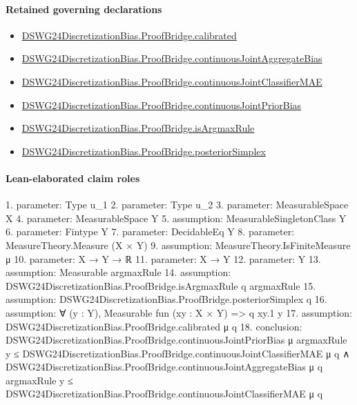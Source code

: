 \documentclass[10pt]{article}
\begin{document}
\paragraph{Retained governing declarations}
\begin{itemize}\raggedright
\item \hyperlink{paper-prerequisite-c94cbc772446ffec}{DSWG24\allowbreak{}Discretization\allowbreak{}Bias.\allowbreak{}Proof\allowbreak{}Bridge.\allowbreak{}calibrated}
\item \hyperlink{governing-declaration-302610b6fa0b99db}{DSWG24\allowbreak{}Discretization\allowbreak{}Bias.\allowbreak{}Proof\allowbreak{}Bridge.\allowbreak{}continuous\allowbreak{}Joint\allowbreak{}Aggregate\allowbreak{}Bias}
\item \hyperlink{governing-declaration-d07991e4ae99da3b}{DSWG24\allowbreak{}Discretization\allowbreak{}Bias.\allowbreak{}Proof\allowbreak{}Bridge.\allowbreak{}continuous\allowbreak{}Joint\allowbreak{}Classifier\allowbreak{}MAE}
\item \hyperlink{governing-declaration-7df1fb937c21cdf5}{DSWG24\allowbreak{}Discretization\allowbreak{}Bias.\allowbreak{}Proof\allowbreak{}Bridge.\allowbreak{}continuous\allowbreak{}Joint\allowbreak{}Prior\allowbreak{}Bias}
\item \hyperlink{paper-prerequisite-2e16c9b0a6f0db1c}{DSWG24\allowbreak{}Discretization\allowbreak{}Bias.\allowbreak{}Proof\allowbreak{}Bridge.\allowbreak{}is\allowbreak{}Argmax\allowbreak{}Rule}
\item \hyperlink{paper-prerequisite-b11323803f325211}{DSWG24\allowbreak{}Discretization\allowbreak{}Bias.\allowbreak{}Proof\allowbreak{}Bridge.\allowbreak{}posterior\allowbreak{}Simplex}
\end{itemize}
\paragraph{Lean-elaborated claim roles}\begin{ReviewVerbatim}
1. parameter: Type u_1
2. parameter: Type u_2
3. parameter: MeasurableSpace X
4. parameter: MeasurableSpace Y
5. assumption: MeasurableSingletonClass Y
6. parameter: Fintype Y
7. parameter: DecidableEq Y
8. parameter: MeasureTheory.Measure (X × Y)
9. assumption: MeasureTheory.IsFiniteMeasure μ
10. parameter: X → Y → ℝ
11. parameter: X → Y
12. parameter: Y
13. assumption: Measurable argmaxRule
14. assumption: DSWG24DiscretizationBias.ProofBridge.isArgmaxRule q argmaxRule
15. assumption: DSWG24DiscretizationBias.ProofBridge.posteriorSimplex q
16. assumption: ∀ (y : Y), Measurable fun (xy : X × Y) => q xy.1 y
17. assumption: DSWG24DiscretizationBias.ProofBridge.calibrated μ q
18. conclusion: DSWG24DiscretizationBias.ProofBridge.continuousJointPriorBias μ argmaxRule y ≤
    DSWG24DiscretizationBias.ProofBridge.continuousJointClassifierMAE μ q ∧
  DSWG24DiscretizationBias.ProofBridge.continuousJointAggregateBias μ q argmaxRule y ≤
    DSWG24DiscretizationBias.ProofBridge.continuousJointClassifierMAE μ q
\end{ReviewVerbatim}
\end{document}
